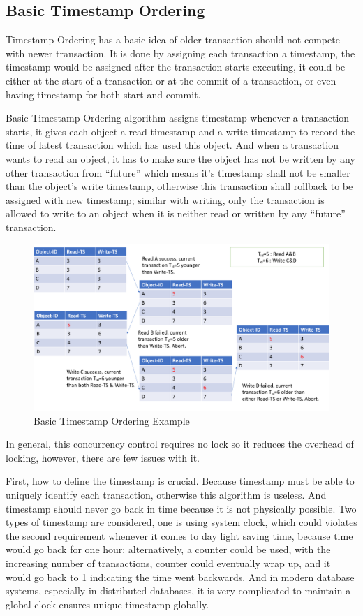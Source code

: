\subsection{Basic Timestamp Ordering}
Timestamp Ordering has a basic idea of older transaction should not compete with newer transaction. It is done by assigning each transaction a timestamp, the timestamp would be assigned after the transaction starts executing, it could be either at the start of a transaction or at the commit of a transaction, or even having timestamp for both start and commit.

Basic Timestamp Ordering algorithm assigns timestamp whenever a transaction starts, it gives each object a read timestamp and a write timestamp to record the time of latest transaction which has used this object. And when a transaction wants to read an object, it has to make sure the object has not be written by any other transaction from ``future'' which means it's timestamp shall not be smaller than the object's write timestamp, otherwise this transaction shall rollback to be assigned with new timestamp; similar with writing, only the transaction is allowed to write to an object when it is neither read or written by any ``future'' transaction.

\begin{figure}[H]
	\centering
	\includegraphics[width=0.8\linewidth]{basicTO.pdf}
	\caption{Basic Timestamp Ordering Example}	
\end{figure}

In general, this concurrency control requires no lock so it reduces the overhead of locking, however, there are few issues with it.

First, how to define the timestamp is crucial. Because timestamp must be able to uniquely identify each transaction, otherwise this algorithm is useless. And timestamp should never go back in time because it is not physically possible. Two types of timestamp are considered, one is using system clock, which could violates the second requirement whenever it comes to day light saving time, because time would go back for one hour; alternatively, a counter could be used, with the increasing number of transactions, counter could eventually wrap up, and it would go back to 1 indicating the time went backwards\cite{bernstein1980timestamp}. And in modern database systems, especially in distributed databases, it is very complicated to maintain a global clock ensures unique timestamp globally\cite{corbett2013spanner}.

